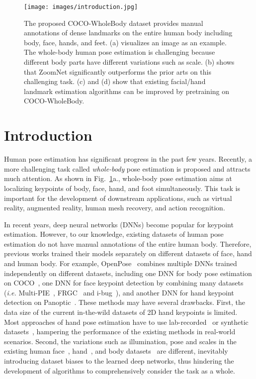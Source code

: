 \documentclass[runningheads]{llncs}
\begin{document}
	\begin{figure}[t]
		\centering
		\texttt{[image: images/introduction.jpg]}
		\caption{The proposed COCO-WholeBody dataset provides manual annotations of dense landmarks on the entire human body including body, face, hands, and feet. (a) visualizes an image as an example. The whole-body human pose estimation is challenging because different body parts have different variations such as scale. (b) shows that ZoomNet significantly outperforms the prior arts on this challenging task.
			(c) and (d) show that existing facial/hand landmark estimation algorithms can be improved by pretraining on COCO-WholeBody.
		}
		\label{fig:motivation}
	\end{figure}
	
	
	\section{Introduction}
	Human pose estimation has significant progress in the past few years. Recently, a more challenging task called \emph{whole-body} pose estimation is proposed and attracts much attention. As shown in Fig.~\ref{fig:motivation}a., whole-body pose estimation aims at localizing keypoints of body, face, hand, and foot simultaneously. This task is important for the development of downstream applications, such as virtual reality, augmented reality, human mesh recovery, and action recognition. 
	
	In recent years, deep neural networks (DNNs) become popular for keypoint estimation. However, to our knowledge, existing datasets of human pose estimation do not have manual annotations of the entire human body.
	Therefore, previous works trained their models separately on different datasets of face, hand and human body. For example, OpenPose~\cite{cao2017realtime} combines multiple DNNs trained independently on different datasets, including one DNN for body pose estimation on COCO~\cite{lin2014microsoft}, one DNN for face keypoint detection by combining many datasets (\emph{i.e.}  Multi-PIE~\cite{Gross2010Image}, FRGC~\cite{phillips2005overview} and i-bug~\cite{sagonas2013300}), and another DNN for hand keypoint detection on Panoptic~\cite{simon2017hand}. These methods may have several drawbacks. First, the data size of the current in-the-wild datasets of 2D hand keypoints is limited. Most approaches of hand pose estimation  have to use lab-recorded~\cite{tompson2014real,gomez2017large} or synthetic datasets~\cite{mueller2018ganerated,mueller2017real,sharp2015accurate}, hampering the performance of the existing methods in real-world scenarios. Second, the variations such as illumination, pose and scales in the existing human face~\cite{belhumeur2013localizing,koestinger2011annotated,le2012interactive,messer1999xm2vtsdb,sagonas2013300,zhu2012face}, hand~\cite{tompson2014real,gomez2017large,gomez2017large,mueller2018ganerated}, and body datasets~\cite{andriluka14cvpr,andriluka2018posetrack,wu2017ai,lin2014microsoft} are different, inevitably introducing dataset biases to the learned deep networks, thus hindering the development of algorithms to comprehensively consider the task as a whole. 
	
\end{document}
